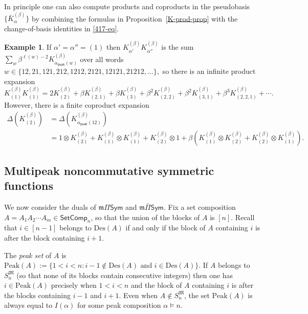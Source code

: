 \documentclass[11pt]{article}
\theoremstyle{definition}
\newtheorem{example}[theo]{Example}
\numberwithin{equation}{section}
\numberwithin{equation}{section}
\newcommand{\fk}{\mathfrak}
\newcommand{\ba}{\begin{aligned}}
\newcommand{\ea}{\end{aligned}}
\newcommand{\Des}{\mathrm{Des}}
\newcommand{\bK}{\bar{K}}
\newcommand{\Sym}{\mathsf{Sym}}
\newcommand{\QSymQ}{\Pi\Sym}
\newcommand{\QSymP}{\bar{\Pi}\Sym}
\newcommand{\mQSymQ}{\mathfrak{m}\QSymQ}
\newcommand{\mQSymP}{\mathfrak{m}\QSymP}
\newcommand{\SetComp}{\mathsf{SetComp}}
\newcommand{\SM}{S^{\fk M}}
\newcommand{\PeakSet}{\mathrm{Peak}}
\newcommand{\cD}{\alpha_{\mathsf{peak}}}
\newcommand{\defn}[1]{{\color{darkred}\emph{#1}}}
\begin{document}
In principle one can also
 compute products and coproducts in the pseudobasis $\{ \bK^{(\beta)}_\alpha\}$
by combining the formulas in Proposition~\ref{K-prod-prop} with the change-of-basis identities in \eqref{417-eq}.

\begin{example}\label{K-prod-ex}
If $\alpha' = \alpha'' = (1)$ then $K^{(\beta)}_{\alpha'} K^{(\beta)}_{\alpha''}
 $
is the sum $ \sum_{w} \beta^{\ell(w) - 2} K^{(\beta)}_{\cD(w)}$ over all words  $w\in \{ 12, 21, 121, 212, 1212, 2121, 12121,21212, \dots\},$ 
so there is an infinite product expansion 
\[K^{(\beta)}_{(1)} K^{(\beta)}_{(1)} 
=
 2 K^{(\beta)}_{(2)} + \beta K^{(\beta)}_{(2,1)} + \beta K^{(\beta)}_{(3)}+ \beta ^2 K^{(\beta)}_{(2,2)}+ \beta^2 K^{(\beta)}_{(3,1)}+ 
 \beta^3 K^{(\beta)}_{(2,2,1)}%
  + \cdots .
\] However, there is a finite coproduct expansion
\[ \ba
\Delta(K^{(\beta)}_{(2)}) &= \Delta(K^{(\beta)}_{\cD(12)})
\\& =
1 \otimes K^{(\beta)}_{(2)} 
+ K^{(\beta)}_{(1)}\otimes K^{(\beta)}_{(1)}
+  K^{(\beta)}_{(2)}\otimes 1
+
\beta\left(  K^{(\beta)}_{(1)}\otimes K^{(\beta)}_{(2)}
+
  K^{(\beta)}_{(2)}\otimes K^{(\beta)}_{(1)}\right).\ea
 \]
\end{example}





 

 


\subsection{Multipeak noncommutative symmetric functions}\label{MPeak-sect}

We now consider the duals of $\mQSymQ$ and $\mQSymP$.
%
Fix a set composition $A = A_1 A_2\cdots A_m \in \SetComp_n$,
so that the union of the blocks of $A$ is $[n]$.
Recall that $i \in [n-1]$ belongs to $\Des(A)$
if and only if the block of $A$ containing $i$ is after the block containing $i+1$. 

The \defn{peak set} of $A$ is
$\PeakSet(A) := \{1<i<n: i -1 \notin \Des(A)\text{ and } i \in \Des(A) \}.$
If $A $ belongs to $ \SM_n$ (so that none of its blocks contain consecutive integers)
 then one has $i \in \PeakSet(A)$ precisely when $1< i <n$ and the block of $A$ containing $i$ is after the 
blocks containing $i-1$ and $i+1$.
Even when $A \notin \SM_n$, the set $\PeakSet(A)$ is always equal to $ I(\alpha)$ for some peak composition $\alpha \vDash n$.
\end{document}
